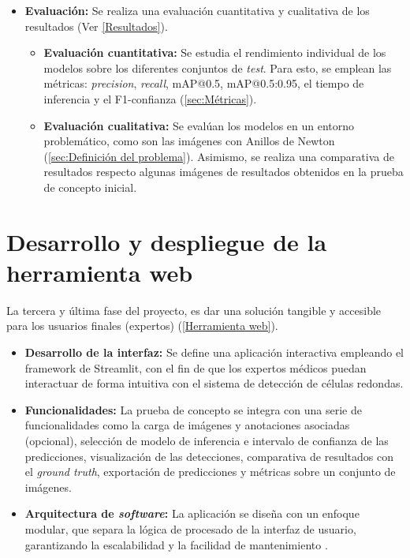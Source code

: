 \documentclass[12pt,a4paper,onecolumn,oneside]{report}
\begin{document}
\begin{itemize}
\begin{itemize}
  \end{itemize}
  \item \textbf{Evaluación:} Se realiza una evaluación cuantitativa y cualitativa de los resultados (Ver \autoref{Resultados}).
  \begin{itemize}
    \item \textbf{Evaluación cuantitativa:} Se estudia el rendimiento individual de los modelos sobre los diferentes conjuntos de \textit{test}. Para esto, se emplean las métricas: 
    \textit{precision}, \textit{recall}, mAP@0.5, mAP@0.5:0.95, el tiempo de inferencia y el F1-confianza (\autoref{sec:Métricas}). 
    \item \textbf{Evaluación cualitativa:} Se evalúan los modelos en un entorno problemático, como son las imágenes con Anillos de Newton (\autoref{sec:Definición del problema}). Asimismo, se realiza una comparativa de resultados respecto algunas imágenes de resultados obtenidos en la prueba de concepto inicial. 
  \end{itemize}
\end{itemize}

\section{Desarrollo y despliegue de la herramienta web}
\label{Despliegue de la herramienta web}

La tercera y última fase del proyecto, es dar una solución tangible y accesible para los usuarios finales (expertos) (\autoref{Herramienta web}).

\begin{itemize}
  \item \textbf{Desarrollo de la interfaz:} Se define una aplicación interactiva empleando el framework de Streamlit, con el fin de que los expertos médicos puedan interactuar de forma intuitiva con el sistema de detección de células redondas.
  \item \textbf{Funcionalidades:} La prueba de concepto se integra con una serie de funcionalidades como la carga de imágenes y anotaciones asociadas (opcional), selección de modelo de inferencia e intervalo de confianza de las predicciones, 
  visualización de las detecciones, comparativa de resultados con el \textit{ground truth}, exportación de predicciones y métricas sobre un conjunto de imágenes. 
  \item \textbf{Arquitectura de \textit{software}:} La aplicación se diseña con un enfoque modular, que separa la lógica de procesado de la interfaz de usuario, garantizando la escalabilidad y la facilidad de mantenimiento \cite{repoTFM}.
\end{itemize}
\end{document}

